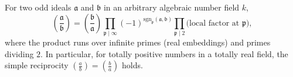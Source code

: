 For two odd ideals $\mathfrak{a}$ and $\mathfrak{b}$ in an arbitrary algebraic number field $k$,
$$\left(\frac{\mathfrak{a}}{\mathfrak{b}}\right) = \left(\frac{\mathfrak{b}}{\mathfrak{a}}\right) \prod_{\mathfrak{p} \mid \infty} (-1)^{\text{sgn}_\mathfrak{p}(\mathfrak{a},\mathfrak{b})} \prod_{\mathfrak{p} \mid 2} \text{(local factor at } \mathfrak{p}),$$
where the product runs over infinite primes (real embeddings) and primes dividing $2$. In particular, for totally positive numbers in a totally real field, the simple reciprocity $\left(\frac{a}{b}\right) = \left(\frac{b}{a}\right)$ holds.
